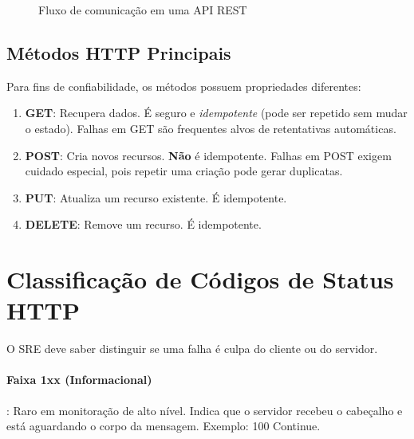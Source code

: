 \documentclass[12pt,a4paper]{report}
\begin{document}
\begin{figure}[h]
    \centering
    \caption{Fluxo de comunicação em uma API REST}
    \label{fig:api-flow}
\end{figure}

\subsection{Métodos HTTP Principais}

Para fins de confiabilidade, os métodos possuem propriedades diferentes:

\begin{enumerate}
    \item \textbf{GET}: Recupera dados. É seguro e \textit{idempotente} (pode ser repetido sem mudar o estado). Falhas em GET são frequentes alvos de retentativas automáticas.
    \item \textbf{POST}: Cria novos recursos. \textbf{Não} é idempotente. Falhas em POST exigem cuidado especial, pois repetir uma criação pode gerar duplicatas.
    \item \textbf{PUT}: Atualiza um recurso existente. É idempotente.
    \item \textbf{DELETE}: Remove um recurso. É idempotente.
\end{enumerate}

\section{Classificação de Códigos de Status HTTP}

O SRE deve saber distinguir se uma falha é culpa do cliente ou do servidor.

\paragraph{Faixa 1xx (Informacional)}: Raro em monitoração de alto nível. Indica que o servidor recebeu o cabeçalho e está aguardando o corpo da mensagem. Exemplo: 100 Continue.
\end{document}
